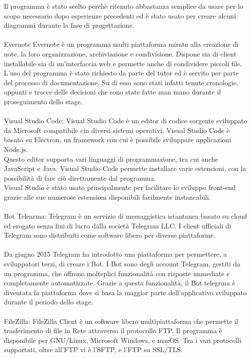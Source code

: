 Il programma è stato scelto perchè ritenuto abbastanza semplice da usare per lo scopo necessario dopo esperienze precedenti ed è stato usato per creare alcuni diagrammi durante la fase di progettazione.
\\\\
Evernote Evernote è un programma multi piattaforma mirato alla creazione di note, la loro organizzazione, archiviazione e condivisione. Dispone sia di client installabile sia di un’interfaccia web e permette anche di condividere piccoli file.
L’uso del programma è stato richiesto da parte del tutor ed è servito per parte del processo di documentazione. Su di esso sono stati infatti tenute cronologie, appunti e tracce delle decisioni che sono state fatte man mano durante il proseguimento dello stage.
\\\\
Visual Studio Code:
Visual Studio Code è un editor di codice sorgente sviluppato da Microsoft compatibile cin diversi sistemi operativi.
Visual Studio Code è basato su Electron, un framework con cui è possibile sviluppare applicazioni Node.js.\\
Questo editor supporta vari linguaggi di programmazione, tra cui anche JavaScript e Java.
Visual Studio Code permette installare varie estensioni, con la possibilità di fare ciò direttamente dal programma. \\
Visual Studio è stato usato principalmente per facilitare lo sviluppo front-end grazie alle sue numerose estensioni disponibili facilmente instancabili. 
\\\\
Bot Telearma: Telegram è un servizio di messaggistica istantanea basato su cloud ed erogato senza fini di lucro dalla società Telegram LLC. I client ufficiali di Telegram sono distribuiti come software libero per diverse piattaforme. \\\\
Da giugno 2015 Telegram ha introdotto una piattaforma per permettere, a sviluppatori terzi, di creare i Bot. I Bot sono degli account Telegram, gestiti da un programma, che offrono molteplici funzionalità con risposte immediate e completamente automatizzate. Grazie a questa funzionalità, il Bot telegrma è diventata la piattaforma dove si basa la maggior parte dell’applicativo sviluppato durante il periodo dello stage.
\\\\
FileZilla: FileZilla Client è un software libero multipiattaforma che permette il trasferimento di file in Rete attraverso il protocollo FTP. Il programma è disponibile per GNU/Linux, Microsoft Windows, e macOS. Tra i vari protocolli supportati, oltre all'FTP vi è l'SFTP, e l'FTP su SSL/TLS. 
